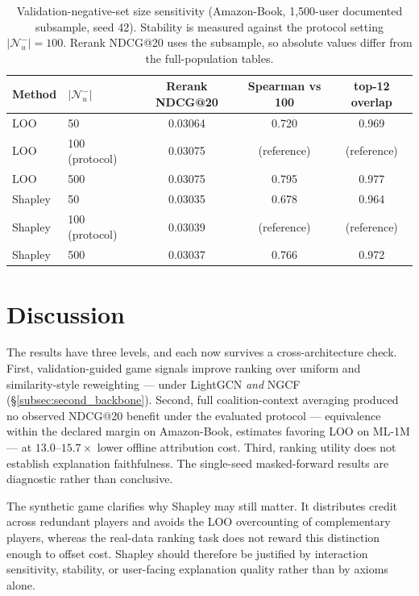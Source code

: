 \documentclass[pdflatex,sn-mathphys-num]{sn-jnl}
\begin{document}
\begin{table}[t]
\caption{Validation-negative-set size sensitivity (Amazon-Book, 1,500-user documented subsample, seed 42). Stability is measured against the protocol setting $|\mathcal{N}_u^-|=100$. Rerank NDCG@20 uses the subsample, so absolute values differ from the full-population tables.}\label{tab:negset_sensitivity}
\centering
\small
\begin{tabular}{llccc}
\toprule
Method & $|\mathcal{N}_u^-|$ & Rerank NDCG@20 & Spearman vs 100 & top-12 overlap \\
\midrule
LOO & 50 & 0.03064 & 0.720 & 0.969 \\
LOO & 100 (protocol) & 0.03075 & (reference) & (reference) \\
LOO & 500 & 0.03075 & 0.795 & 0.977 \\
Shapley & 50 & 0.03035 & 0.678 & 0.964 \\
Shapley & 100 (protocol) & 0.03039 & (reference) & (reference) \\
Shapley & 500 & 0.03037 & 0.766 & 0.972 \\
\bottomrule
\end{tabular}
\end{table}

\section{Discussion}\label{sec:discussion}
The results have three levels, and each now survives a cross-architecture check. First, validation-guided game signals improve ranking over uniform and similarity-style reweighting --- under LightGCN \emph{and} NGCF (\S\ref{subsec:second_backbone}). Second, full coalition-context averaging produced no observed NDCG@20 benefit under the evaluated protocol --- equivalence within the declared margin on Amazon-Book, estimates favoring LOO on ML-1M --- at $13.0$--$15.7\times$ lower offline attribution cost. Third, ranking utility does not establish explanation faithfulness. The single-seed masked-forward results are diagnostic rather than conclusive.

The synthetic game clarifies why Shapley may still matter. It distributes credit across redundant players and avoids the LOO overcounting of complementary players, whereas the real-data ranking task does not reward this distinction enough to offset cost. Shapley should therefore be justified by interaction sensitivity, stability, or user-facing explanation quality rather than by axioms alone.
\end{document}
